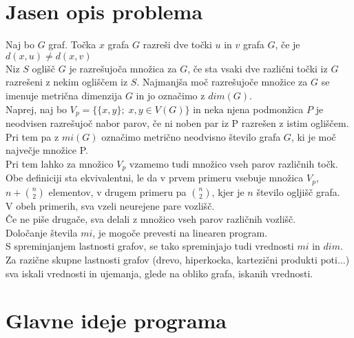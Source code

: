 \documentclass[a4paper]{article}
\begin{document}
\section{Jasen opis problema}
Naj bo $G$ graf. Točka $x$ grafa $G$ razreši dve točki $u$ in $v$ grafa $G$, če je $d(x,u) \neq d(x,v)$\\
Niz $S$ oglišč $G$ je razrešujoča množica za $G$, če sta vsaki dve različni točki
iz $G$ razrešeni z nekim ogliščem iz $S$. Najmanjša moč
razrešujoče množice za $G$ se imenuje metrična dimenzija $G$ in jo označimo z $dim(G)$. \\
Naprej, naj bo $V_{p}=\{\{x,y\}; \; x,y \in V(G)\}$ in neka njena podmonžica $P$ je neodvisen razrešujoč nabor parov, če ni noben par iz P razrešen z istim ogliščem. Pri tem pa z $mi(G)$ označimo metrično neodvisno število grafa $G$, ki je moč največje množice P. \\
Pri tem lahko za množico $V_{p}$ vzamemo tudi množico vseh  parov različnih točk. Obe definiciji sta ekvivalentni, le da v prvem primeru vsebuje množica $V_{p}$, $n + {n\choose2}$ elementov, v drugem primeru pa ${n\choose2}$, kjer je $n$ število ogljišč grafa.\\
V obeh primerih, sva vzeli neurejene pare vozlišč.\\
Če ne piše drugače, sva delali z množico vseh parov različnih vozlišč.\\
Določanje števila $mi$, je mogoče prevesti na linearen program.\\
S spreminjanjem lastnosti grafov, se tako spreminjajo tudi vrednosti $mi$ in $dim$. Za razične skupne lastnosti grafov (drevo, hiperkocka, kartezični produkti poti...) sva iskali vrednosti in ujemanja, glede na obliko grafa, iskanih vrednosti.


\section{Glavne ideje programa}
\end{document}
